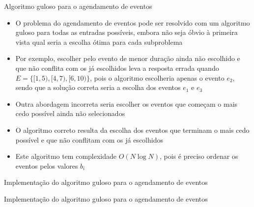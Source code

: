 \begin{frame}[fragile]{Algoritmo guloso para o agendamento de eventos}

    \begin{itemize}
        \item O problema do agendamento de eventos pode ser resolvido com um algoritmo guloso
            para todas as entradas possíveis, embora não seja óbvio à primeira vista qual seria
            a escolha ótima para cada subproblema

        \item Por exemplo, escolher pelo evento de menor duração ainda não escolhido e que não
            conflita com os já escolhidos leva a resposta errada quando $E = \lbrace 
                [1, 5), [4, 7), [6, 10)\rbrace$, pois o algoritmo escolheria apenas o evento 
            $e_2$, sendo que a solução correta seria a escolha dos eventos $e_1$ e $e_3$

        \item Outra abordagem incorreta seria escolher os eventos que começam o mais cedo possível
            ainda não selecionados

        \item O algoritmo correto resulta da escolha dos eventos que terminam o mais cedo
            possível e que não conflitam com os já escolhidos

        \item Este algoritmo tem complexidade $O(N\log N)$, pois é preciso ordenar os eventos
            pelos valores $b_i$
    \end{itemize}

\end{frame}

\begin{frame}[fragile]{Implementação do algoritmo guloso para o agendamento de eventos}
\end{frame}

\begin{frame}[fragile]{Implementação do algoritmo guloso para o agendamento de eventos}
\end{frame}
